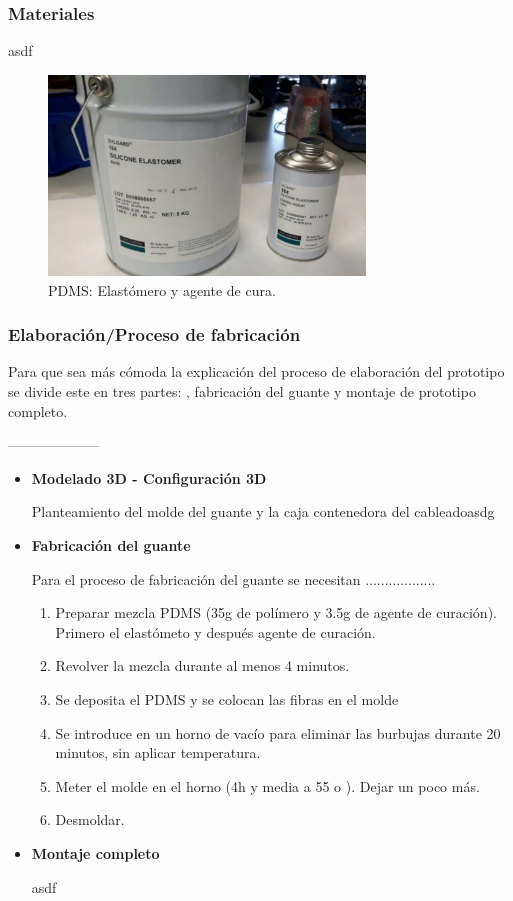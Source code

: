 \subsubsection{Materiales}
asdf
\begin{figure}[H]
	\centering
	\includegraphics[width=0.75\textwidth]{./img/PDMS}
	\caption{PDMS: Elastómero y agente de cura.} \label{fig:pdms}
\end{figure}



\subsubsection{Elaboración/Proceso de fabricación}

Para que sea más cómoda la explicación del proceso de elaboración del prototipo se divide este en tres partes: , fabricación del guante y montaje de prototipo completo.

--------------------

\begin{itemize}
	\item \textbf{Modelado 3D - Configuración 3D}
	
	Planteamiento del molde del guante y la caja contenedora del cableadoasdg	
 
	\item \textbf{Fabricación del guante}
	
	Para el proceso de fabricación del guante se necesitan ..................
	
	\begin{enumerate}
		\item Preparar mezcla PDMS (35g de polímero y 3.5g de agente de curación). Primero el
		elastómeto y después agente de curación.
		\item Revolver la mezcla durante al menos 4 minutos.
		\item Se deposita el PDMS y se colocan las fibras en el molde
		\item Se introduce en un horno de vacío para eliminar las burbujas durante 20 minutos, sin aplicar
		temperatura.
		\item Meter el molde en el horno (4h y media a 55 o ). Dejar un poco más.
		\item Desmoldar.
	\end{enumerate}
	
	
	\item \textbf{Montaje completo}
	
	asdf
	
\end{itemize}

